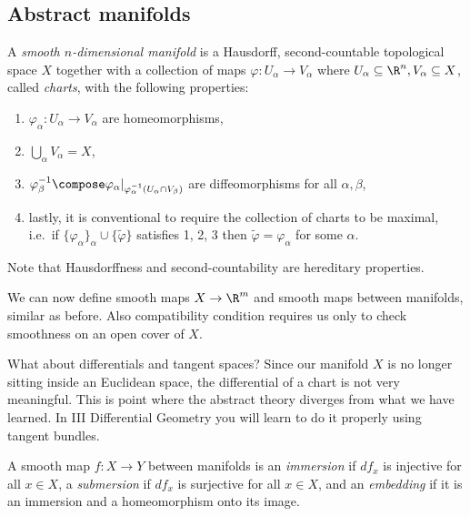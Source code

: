 \documentclass[a4paper]{article}
\begin{document}
\subsection{Abstract manifolds}

\begin{definition}
  A \emph{smooth \(n\)-dimensional manifold} is a Hausdorff, second-countable topological space \(X\) together with a collection of maps \(\varphi: U_\alpha \to V_\alpha\) where \(U_\alpha \subseteq \R^n, V_\alpha \subseteq X\), called \emph{charts}, with the following properties:
  \begin{enumerate}
  \item \(\varphi_\alpha: U_\alpha \to V_\alpha\) are homeomorphisms,
  \item \(\bigcup_\alpha V_\alpha = X\),
  \item \(\varphi_\beta^{-1} \compose \varphi_\alpha|_{\varphi_\alpha^{-1}(U_\alpha \cap V_\beta)}\) are diffeomorphisms for all \(\alpha, \beta\),
  \item lastly, it is conventional to require the collection of charts to be maximal, i.e.\ if \(\{\varphi_\alpha\}_\alpha \cup \{\tilde \varphi\}\) satisfies 1, 2, 3 then \(\tilde \varphi = \varphi_\alpha\) for some \(\alpha\).
  \end{enumerate}
\end{definition}

Note that Hausdorffness and second-countability are hereditary properties.

We can now define smooth maps \(X \to \R^m\) and smooth maps between manifolds, similar as before. Also compatibility condition requires us only to check smoothness on an open cover of \(X\).

What about differentials and tangent spaces? Since our manifold \(X\) is no longer sitting inside an Euclidean space, the differential of a chart is not very meaningful. This is point where the abstract theory diverges from what we have learned. In III Differential Geometry you will learn to do it properly using tangent bundles.

\begin{definition}
  A smooth map \(f: X \to Y\) between manifolds is an \emph{immersion} if \(df_x\) is injective for all \(x \in X\), a \emph{submersion} if \(df_x\) is surjective for all \(x \in X\), and an \emph{embedding} if it is an immersion and a homeomorphism onto its image.
\end{definition}
\end{document}
